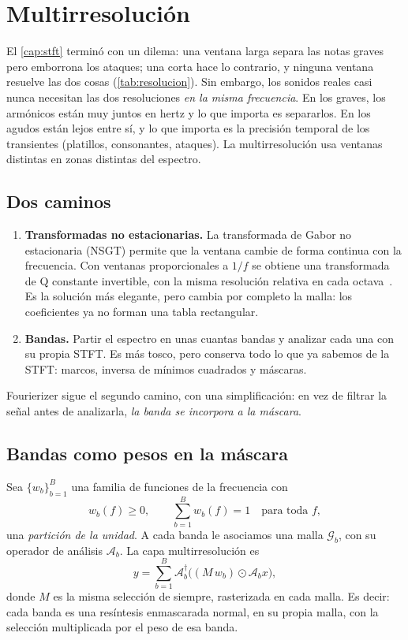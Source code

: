 \chapter{Multirresolución}\label{cap:multirresolucion}

El \cref{cap:stft} terminó con un dilema: una ventana larga separa las notas graves pero emborrona
los ataques; una corta hace lo contrario, y ninguna ventana resuelve las dos cosas
(\cref{tab:resolucion}). Sin embargo, los sonidos reales casi nunca necesitan las dos resoluciones
\emph{en la misma frecuencia}. En los graves, los armónicos están muy juntos en hertz y lo que
importa es separarlos. En los agudos están lejos entre sí, y lo que importa es la precisión
temporal de los transientes (platillos, consonantes, ataques). La multirresolución usa ventanas
distintas en zonas distintas del espectro.

\section{Dos caminos}

\begin{enumerate}
  \item \textbf{Transformadas no estacionarias.} La transformada de Gabor no estacionaria (NSGT)
        permite que la ventana cambie de forma continua con la frecuencia. Con ventanas
        proporcionales a $1/f$ se obtiene una transformada de Q constante invertible, con la misma
        resolución relativa en cada octava~\cite{velasco2011}. Es la solución más elegante, pero
        cambia por completo la malla: los coeficientes ya no forman una tabla rectangular.
  \item \textbf{Bandas.} Partir el espectro en unas cuantas bandas y analizar cada una con su
        propia STFT. Es más tosco, pero conserva todo lo que ya sabemos de la STFT: marcos,
        inversa de mínimos cuadrados y máscaras.
\end{enumerate}

Fourierizer sigue el segundo camino, con una simplificación: en vez de filtrar la señal antes de
analizarla, \emph{la banda se incorpora a la máscara}.

\section{Bandas como pesos en la máscara}

Sea $\{w_b\}_{b=1}^{B}$ una familia de funciones de la frecuencia con
\begin{equation}\label{eq:particion}
  w_b(f)\ge0,\qquad \sum_{b=1}^{B}w_b(f)=1\quad\text{para toda } f,
\end{equation}
una \emph{partición de la unidad}. A cada banda le asociamos una malla $\mathcal G_b$, con su
operador de análisis $\mathcal A_b$. La capa multirresolución es
\begin{equation}\label{eq:multires}
  y=\sum_{b=1}^{B}\mathcal A_b^{\dagger}\bigl((M\,w_b)\odot\mathcal A_b x\bigr),
\end{equation}
donde $M$ es la misma selección de siempre, rasterizada en cada malla. Es decir: cada banda es una
resíntesis enmascarada normal, en su propia malla, con la selección multiplicada por el peso de esa
banda.

